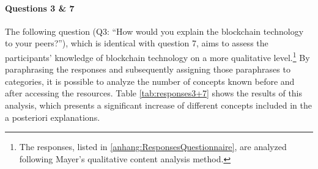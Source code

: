 \paragraph{Questions 3 \& 7} The following question (Q3: \enquote{How would you explain the blockchain technology to your peers?}), which is identical with question 7, aims to assess the participants' knowledge of blockchain technology on a more qualitative level.\footnote{The responses, listed in \ref{anhang:ResponsesQuestionnaire}, are analyzed following Mayer's qualitative content analysis method.} By paraphrasing the responses and subsequently assigning those paraphrases to categories, it is possible to analyze the number of concepts known before and after accessing the resources. Table \ref{tab:responses3+7} shows the results of this analysis, which presents a significant increase of different concepts included in the a posteriori explanations.


